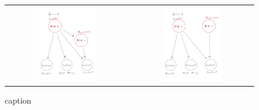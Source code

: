 \documentclass{article}[10pt]
\begin{document}
\begin{figure}[! ht]
    \centering

    \begin{tabular}{c|c}
        \includegraphics[width=0.5\textwidth]{figures/IMG_38A57C8FE8C1-1.jpeg.pdf} & 
        \includegraphics[width=0.5\textwidth]{figures/IMG_C8BDE58C72C5-1.jpeg.pdf}\\
    \end{tabular}
    
    \caption{caption}
    \label{fig:clusterInteraction}
\end{figure}
\end{document}
